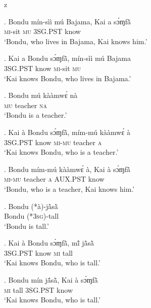 z   \documentclass{assets/fieldnotes}
\begin{document}
\exg. Bondu mín-sìì mú Bajama, Kai a sɔ́ɱfã̀\\
{} \textsc{mi}-sit \textsc{mu} {} {} \textsc{3SG.PST} know\\
`Bondu, who lives in Bajama, Kai knows him.’

\exg. Kai a Bondu sɔ́ɱfã̀, mín-sìì mú Bajama\\
{} \textsc{3SG.PST} {} know \textsc{mi}-sit \textsc{mu} {}\\
`Kai knows Bondu, who lives in Bajama.’

\exg. Bondu mú kààmwɛ́ nà\\
{} \textsc{mu} teacher \textsc{na}\\
`Bondu is a teacher.’

\exg. Kai à Bondu sɔ́ɱfã̀, mím-mú kààmwɛ́ à\\
{} \textsc{3SG.PST} {} know \textsc{mi-mu} teacher \textsc{a}\\
`Kai knows Bondu, who is a teacher.’

\exg. Bondu mím-mú kààmwɛ́ à, Kai à sɔ́ɱfã̀\\
{} \textsc{mi-mu} teacher \textsc{a} {} \textsc{AUX.PST} know\\
`Bondu, who is a teacher, Kai knows him.’

\exg. Bondu (*à)-jã̀sã̀\\
Bondu (*\textsc{3sg})-tall\\
`Bondu is tall.’



\exg. Kai à Bondu sɔ́ɱfã̀, mĩ́ jã̀sã̀\\
{} \textsc{3SG.PST} {} know \textsc{mi} tall\\
`Kai knows Bondu, who is tall.’

\exg. Bondu mín jã́sã̀, Kai à sɔ́ɱfã̀\\
{} \textsc{mi} tall \textsc{3SG.PST} {} know\\
`Kai knows Bondu, who is tall.’


\end{document}
